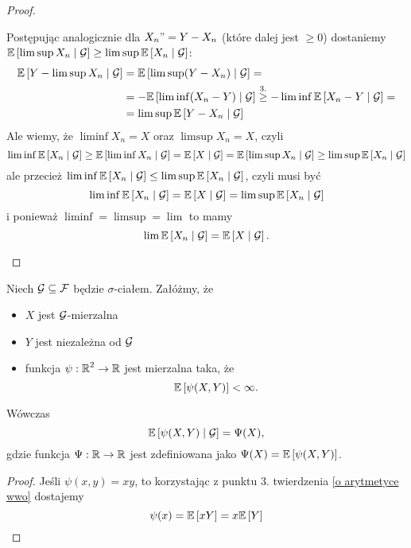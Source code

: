 \begin{proof}
\begin{enumerate}
      Postępując analogicznie dla $X_n"=Y-X_n$ (które dalej jest $\geq0$) dostaniemy $\expected{\limsup X_n}{\set{G}}\geq\limsup\expected{X_n}{\set{G}}$:
      \begin{align*}
        \expected{Y-\limsup X_n}{\set{G}}&=\expected{\limsup(Y-X_n)}{\set{G}}=\\
                                         &=-\expected{\liminf(X_n-Y)}{\set{G}}\overset{3.}{\geq}-\liminf\expected{X_n-Y}{\set{G}}=\\
                                         &=\limsup\expected{Y-X_n}{\set{G}}
      \end{align*}
      Ale wiemy, że $\liminf X_n=X$ oraz $\limsup X_n=X$, czyli
      $$\liminf\expected{X_n}{\set{G}}\geq\expected{\liminf X_n}{\set{G}}=\expected{X}{\set{G}}=\expected{\limsup{X_n}}{\set{G}}\geq\limsup\expected{X_n}{\set{G}}$$
      ale przecież $\liminf\expected{X_n}{\set{G}}\leq\limsup\expected{X_n}{\set{G}}$, czyli musi być
      $$\liminf\expected{X_n}{\set{G}}=\expected{X}{\set{G}}=\limsup\expected{X_n}{\set{G}}$$
      i ponieważ $\liminf=\limsup=\lim$ to mamy
      $$\lim\expected{X_n}{\set{G}}=\expected{X}{\set{G}}.$$
  \end{enumerate}
\end{proof}

\begin{theorem}
  Niech $\mathcal{G}\subseteq\mathcal{F}$ będzie $\sigma$-ciałem. Załóżmy, że
  \begin{itemize}
    \item $X$ jest $\mathcal{G}$-mierzalna
    \item $Y$ jest niezależna od $\mathcal{G}$
    \item funkcja $\psi:\operatorname{\mathbb{R}}^2\to\operatorname{\mathbb{R}}$ jest mierzalna taka, że
      $$\expected{\psi(X,Y)}<\infty.$$
  \end{itemize}
  Wówczas 
  $$\expected{\psi(X,Y)}{\set{G}}=\Psi(X),$$ 
  gdzie funkcja $\Psi:\operatorname{\mathbb{R}}\to\operatorname{\mathbb{R}}$ jest zdefiniowana jako $\Psi(X)=\expected{\psi(X,Y)}$.
\end{theorem}

\begin{proof}
  Jeśli $\psi(x,y)=xy$, to korzystając z punktu 3. twierdzenia \ref{o arytmetyce wwo} dostajemy
  $$\psi(x)=\expected{xY}=x\expected{Y}$$
\end{proof}
